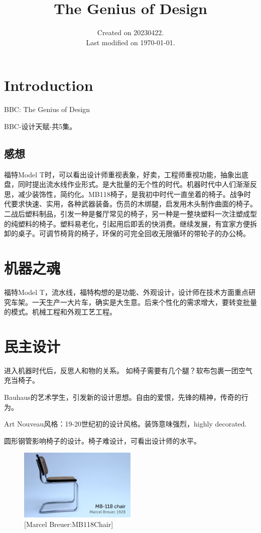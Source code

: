 \documentclass[UTF8]{../../../../RepresentationUniverse}
\begin{document}
\title{The Genius of Design}
\date{Created on 20230422.\\   Last modified on \today.}
\maketitle
\tableofcontents

\chapter{Introduction}

BBC: The Genius of Design

BBC-设计天赋-共5集。

\section{感想}
福特Model T时，可以看出设计师重视表象，好卖，工程师重视功能，抽象出底盘，同时提出流水线作业形式。是大批量的无个性的时代。机器时代中人们渐渐反思，减少装饰性，简约化。MB118椅子，是我初中时代一直坐着的椅子。战争时代要求快速、实用，各种武器装备。伤员的木绑腿，启发用木头制作曲面的椅子。二战后塑料制品，引发一种是餐厅常见的椅子，另一种是一整块塑料一次注塑成型的纯塑料的椅子。塑料易老化，引起用后即丢的快消费。继续发展，有宜家方便拆卸的桌子。可调节椅背的椅子，环保的可完全回收无限循环的带轮子的办公椅。


\chapter{机器之魂}

福特Model T，流水线，福特构想的是功能、外观设计，设计师在技术方面重点研究车架。一天生产一大片车，确实是大生意。后来个性化的需求增大，要转变批量的模式。机械工程和外观工艺工程。


\chapter{民主设计}

进入机器时代后，反思人和物的关系。
如椅子需要有几个腿？软布包裹一团空气充当椅子。

Bauhaus的艺术学生，引发新的设计思想。自由的爱恨，先锋的精神，传奇的行为。

Art Nouveau风格：19-20世纪初的设计风格。装饰意味强烈，highly decorated.

圆形钢管影响椅子的设计。椅子难设计，可看出设计师的水平。

\begin{figure}[h]
    \centering
    \includegraphics[width=0.5\textwidth]{./src/figures/MB118Chair_2023-04-09_16-42-08.png}
    \caption{[Marcel Breuer:MB118Chair]}
    \label{figure:MB118Chair}
\end{figure}
\end{document}
